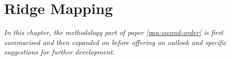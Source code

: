 \chapter{Ridge Mapping}
\label{chap:erm}
\textit{In this chapter, the methodology part of paper \ref{pap:second-order} is first summarised and then expanded on before offering an outlook and specific suggestions for further development.}




